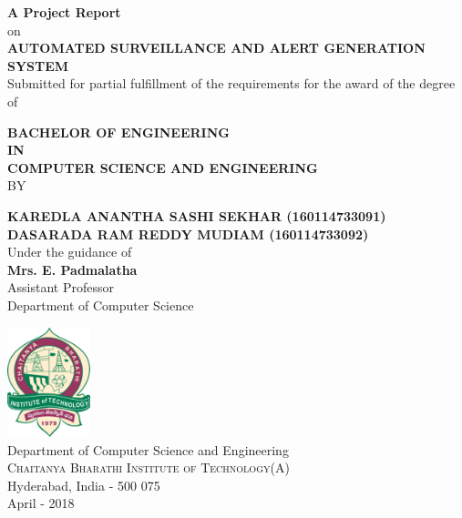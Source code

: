 \begin{titlepage}

\begin{center}

\textup{\small {\bf A Project Report} \\ on}\\[0.2in]

\Large \textbf {AUTOMATED SURVEILLANCE AND ALERT GENERATION SYSTEM}\\[0.5in]

       \small Submitted for partial fulfillment of the requirements for the award of the degree of
        \vspace{.2in}

       {\bf BACHELOR OF ENGINEERING \\IN\\ COMPUTER SCIENCE AND ENGINEERING}\\[0.2in]

\normalsize BY \\
\vspace{.1in}

\footnotesize \textbf{KAREDLA ANANTHA SASHI SEKHAR (160114733091)}\\
\footnotesize \textbf{DASARADA RAM REDDY MUDIAM (160114733092)}\\


\vspace{.1in}
Under the guidance of\\
{\textbf{Mrs. E. Padmalatha}}\\
Assistant Professor\\
Department of Computer Science\\[0.2in]
\vfill

\includegraphics[width=0.18\textwidth]{./cbit-logo}\\[0.1in]
\Large{Department of Computer Science and Engineering}\\
\normalsize
\textsc{Chaitanya Bharathi Institute of Technology(A)}\\
Hyderabad, India - 500 075 \\
April - 2018

\end{center}

\end{titlepage}